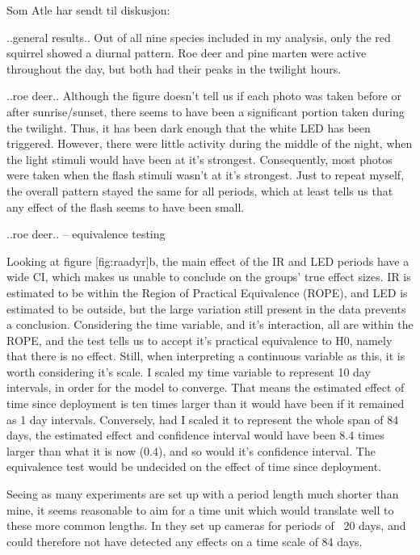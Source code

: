 Som Atle har sendt til diskusjon:

..general results..
Out of all nine species included in my analysis, only the red squirrel showed a diurnal pattern.
Roe deer and pine marten were active throughout the day, but both had their peaks in the twilight hours. 

..roe deer..
Although the figure doesn’t tell us if each photo was taken before or after sunrise/sunset, there seems to have been a significant portion taken during the twilight. Thus, it has been dark enough that the white LED has been triggered. However, there were little activity during the middle of the night, when the light stimuli would have been at it’s strongest. Consequently, most photos were taken when the flash stimuli wasn’t at it’s strongest.
Just to repeat myself, the overall pattern stayed the same for all periods, which at least tells us that any effect of the flash seems to have been small.


..roe deer.. -- equivalence testing %

Looking at figure [fig:raadyr]b, the main effect of the IR and LED periods have a wide CI, which makes us unable to conclude on the groups’ true effect sizes. IR is estimated to be within the Region of Practical Equivalence (ROPE), and LED is estimated to be outside, but the large variation still present in the data prevents a conclusion. Considering the time variable, and it’s interaction, all are within the ROPE, and the test tells us to accept it’s practical equivalence to H0, namely that there is no effect.
Still, when interpreting a continuous variable as this, it is worth considering it’s scale. I scaled my time variable to represent 10 day intervals, in order for the model to converge. That means the estimated effect of time since deployment is ten times larger than it would have been if it remained as 1 day intervals. Conversely, had I scaled it to represent the whole span of 84 days, the estimated effect and confidence interval would have been 8.4 times larger than what it is now (0.4), and so would it’s confidence interval. The equivalence test would be undecided on the effect of time since deployment.


Seeing as many experiments are set up with a period length much shorter than mine, it seems reasonable to aim for a time unit which would translate well to these more common lengths. In \cite{Heinrich2020} they set up cameras for periods of ~20 days,%
and could therefore not have detected any effects on a time scale of 84 days.


